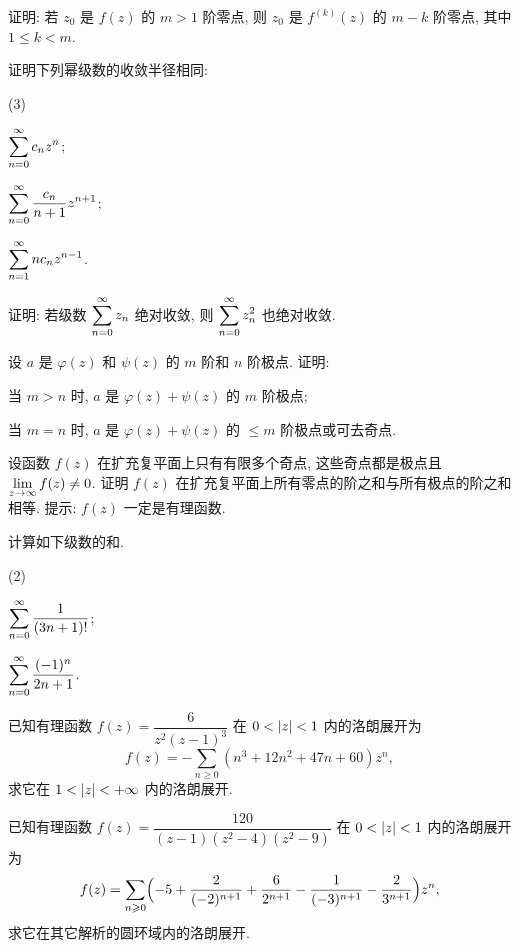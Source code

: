 \begin{homework}
\begin{homework}
    \item 证明: 若 $z_0$ 是 $f(z)$ 的 $m>1$ 阶零点, 则 $z_0$ 是 $f^{(k)}(z)$ 的 $m-k$ 阶零点, 其中 $1\le k<m$.
    \item 证明下列幂级数的收敛半径相同:
      \begin{subhomework}(3)
        \item $\sumf0 c_nz^n$;
        \item $\sumf0 \dfrac{c_n}{n+1}z^{n+1}$;
        \item $\sumf1 nc_nz^{n-1}$.
      \end{subhomework}
    \item 证明: 若级数 $\sumf0 z_n$ 绝对收敛, 则 $\sumf0 z_n^2$ 也绝对收敛.
    \item 设 $a$ 是 $\varphi(z)$ 和 $\psi(z)$ 的 $m$ 阶和 $n$ 阶极点. 证明:
      \begin{subhomework}
        \item 当 $m>n$ 时, $a$ 是 $\varphi(z)+\psi(z)$ 的 $m$ 阶极点;
        \item 当 $m=n$ 时, $a$ 是 $\varphi(z)+\psi(z)$ 的 $\le m$ 阶极点或可去奇点.
      \end{subhomework}
    \item 设函数 $f(z)$ 在扩充复平面上只有有限多个奇点, 这些奇点都是极点且 $\liml_{z\ra\infty}f(z)\neq0$.
      证明 $f(z)$ 在扩充复平面上所有零点的阶之和与所有极点的阶之和相等. 提示: $f(z)$ 一定是有理函数.
    \item \optionalex 计算如下级数的和.
    \begin{subhomework}(2)
      \item $\sumf0 \dfrac1{(3n+1)!}$;
      \item $\sumf0 \dfrac{(-1)^n}{2n+1}$.
    \end{subhomework}
    \item \optionalex 已知有理函数 $f(z)=\dfrac{6}{z^2(z-1)^3}$ 在 $0<\abs{z}<1$ 内的洛朗展开为
      \[
        f(z)=-\sum_{n\ge 0}(n^3+12n^2+47n+60)z^n,
      \]
      求它在 $1<\abs{z}<+\infty$ 内的洛朗展开.
    \item \optionalex 已知有理函数 $f(z)=\dfrac{120}{(z-1)(z^2-4)(z^2-9)}$ 在 $0<\abs{z}<1$ 内的洛朗展开为
      \[
        f(z)=\sum_{n\ge 0}\Bigl(-5+\frac2{(-2)^{n+1}}+\frac6{2^{n+1}}-\frac1{(-3)^{n+1}}-\frac2{3^{n+1}}\Bigr)z^n,
      \]
      求它在其它解析的圆环域内的洛朗展开.
  \end{homework}
\end{homework}

